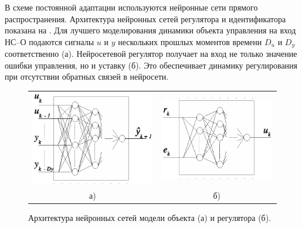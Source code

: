 В схеме постоянной адаптации используются нейронные сети прямого
распространения.  Архитектура нейронных сетей регулятора и
идентификатора показана на .  Для лучшего
моделирования динамики объекта управления на вход НС--О подаются
сигналы $u$ и $y$ нескольких прошлых моментов времени $D_u$ и $D_y$
соответственно (а).  Нейросетевой
регулятор получает на вход не только значение ошибки управления, но и
уставку (б).  Это обеспечивает динамику
регулирования при отсутствии обратных связей в нейросети.

\begin{figure}[h]
\centering
\begin{tabular}{cc}
\includegraphics{nonst_nnp_schema} & \includegraphics{nonst_nnc_schema} \\
а) & б)\\
\end{tabular}
\caption{Архитектура нейронных сетей модели объекта (а) и регулятора (б).}
\label{fig:nonst_nn_schema}
\end{figure}

